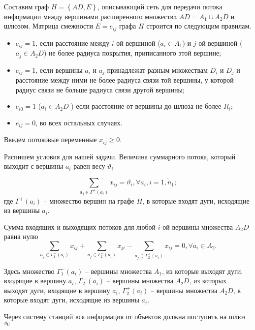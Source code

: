 Составим граф $H=\left\{AD,E\right\}$, описывающий сеть для передачи потока информации между вершинами расширенного множествa $AD=A_1 \cup A_2D$ и шлюзом.
Матрица смежности $E = e_{ij}$ графа $H$ строится по следующим правилам.

\begin{itemize}
    \item $e_{ij} = 1$, если расстояние между $i$-ой вершиной ($a_i \in A_1$) и $j$-ой вершиной ($a_j \in A_2D$) не более радиуса покрытия, приписанного этой вершине;
    \item $e_{ij} = 1$, если вершины $a_i$ и $a_j$   принадлежат разным множествам $D_i$ и $D_j$ и расстояние между ними не более радиуса связи той вершины, у которой радиус связи не больше радиуса связи другой вершины;
    \item $e_{i0} = 1$ ($a_i \in A_2D$ ) если расстояние от вершины до шлюза не более $R_i$;
    \item $e_{ij} = 0$, во всех остальных случаях.
\end{itemize}

Введем потоковые переменные $x_{ij} \geqslant 0$.

Распишем условия для нашей задачи.
Величина суммарного потока, который выходит с вершины $a_i$ равен весу $\vartheta_i$

\begin{equation}\label{eq:part2_1.5}
    \sum_{a_j \in \Gamma^+(a_i)} x_{ij} = \vartheta_i, \forall a_i, i =\overline{1, n_1};
\end{equation} 
где $\Gamma^+(a_i)$ -- множество вершин на графе $H$, в которые входят дуги, исходящие из вершины $a_i$.

Сумма входящих и выходящих потоков для любой $i$-ой вершины множества $A_2D$ равна нулю
\begin{equation}\label{eq:part2_1.6}
    \sum_{a_j \in \Gamma_1^-(a_i)} x_{ij} + \sum_{a_j \in \Gamma_2^-(a_i)} x_{ji} -  \sum_{a_j \in \Gamma_2^+(a_i)} x_{ij} =0 ,\forall a_i \in A_2. 
\end{equation} 

Здесь множество $\Gamma_1^-(a_i)$ -- вершины множества $A_1$, из которые выходят дуги, входящие в вершину $a_i$, $\Gamma_2^-(a_i)$ -- вершины множества $A_2D$, из которых выходят дуги, входящие в  вершину $a_i$, $\Gamma_2^+(a_i)$ -- вершины множества $A_2D$, в которые входят дуги, исходящие из вершины  $a_i$.

Через систему станций вся информация от объектов  должна поступить на шлюз $s_0$ 


